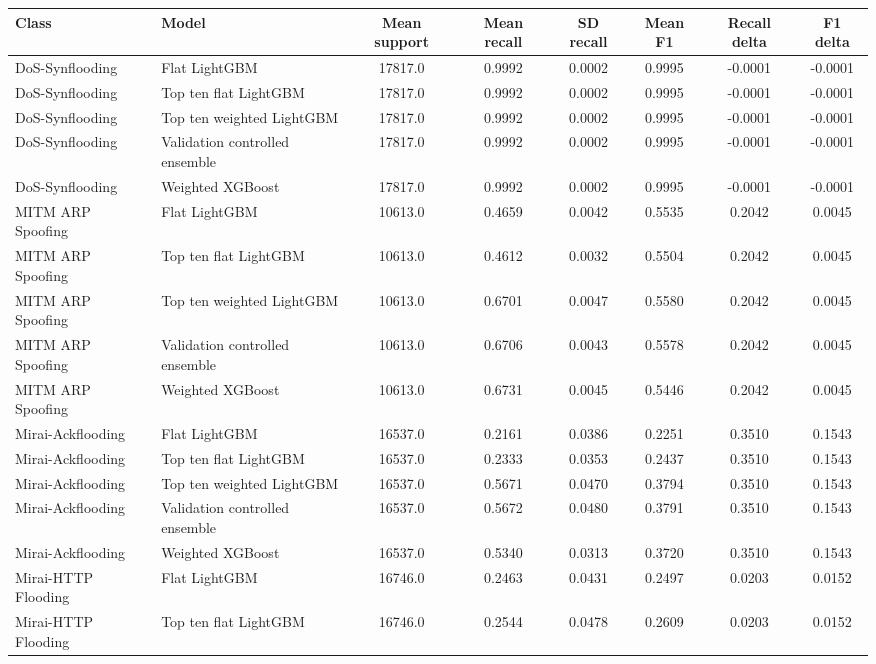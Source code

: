 \documentclass[10pt]{article}
\begin{document}
\begin{center}
\tiny
\setlength{\tabcolsep}{2pt}
\begin{longtable}{p{2.4cm}p{2.6cm}cccccc}
\toprule
Class & Model & Mean support & Mean recall & SD recall & Mean F1 & Recall delta & F1 delta \\
\midrule
\endhead
DoS-Synflooding & Flat LightGBM & 17817.0 & 0.9992 & 0.0002 & 0.9995 & -0.0001 & -0.0001 \\
DoS-Synflooding & Top ten flat LightGBM & 17817.0 & 0.9992 & 0.0002 & 0.9995 & -0.0001 & -0.0001 \\
DoS-Synflooding & Top ten weighted LightGBM & 17817.0 & 0.9992 & 0.0002 & 0.9995 & -0.0001 & -0.0001 \\
DoS-Synflooding & Validation controlled ensemble & 17817.0 & 0.9992 & 0.0002 & 0.9995 & -0.0001 & -0.0001 \\
DoS-Synflooding & Weighted XGBoost & 17817.0 & 0.9992 & 0.0002 & 0.9995 & -0.0001 & -0.0001 \\
MITM ARP Spoofing & Flat LightGBM & 10613.0 & 0.4659 & 0.0042 & 0.5535 & 0.2042 & 0.0045 \\
MITM ARP Spoofing & Top ten flat LightGBM & 10613.0 & 0.4612 & 0.0032 & 0.5504 & 0.2042 & 0.0045 \\
MITM ARP Spoofing & Top ten weighted LightGBM & 10613.0 & 0.6701 & 0.0047 & 0.5580 & 0.2042 & 0.0045 \\
MITM ARP Spoofing & Validation controlled ensemble & 10613.0 & 0.6706 & 0.0043 & 0.5578 & 0.2042 & 0.0045 \\
MITM ARP Spoofing & Weighted XGBoost & 10613.0 & 0.6731 & 0.0045 & 0.5446 & 0.2042 & 0.0045 \\
Mirai-Ackflooding & Flat LightGBM & 16537.0 & 0.2161 & 0.0386 & 0.2251 & 0.3510 & 0.1543 \\
Mirai-Ackflooding & Top ten flat LightGBM & 16537.0 & 0.2333 & 0.0353 & 0.2437 & 0.3510 & 0.1543 \\
Mirai-Ackflooding & Top ten weighted LightGBM & 16537.0 & 0.5671 & 0.0470 & 0.3794 & 0.3510 & 0.1543 \\
Mirai-Ackflooding & Validation controlled ensemble & 16537.0 & 0.5672 & 0.0480 & 0.3791 & 0.3510 & 0.1543 \\
Mirai-Ackflooding & Weighted XGBoost & 16537.0 & 0.5340 & 0.0313 & 0.3720 & 0.3510 & 0.1543 \\
Mirai-HTTP Flooding & Flat LightGBM & 16746.0 & 0.2463 & 0.0431 & 0.2497 & 0.0203 & 0.0152 \\
Mirai-HTTP Flooding & Top ten flat LightGBM & 16746.0 & 0.2544 & 0.0478 & 0.2609 & 0.0203 & 0.0152 \\

\end{longtable}
\end{center}
\end{document}
